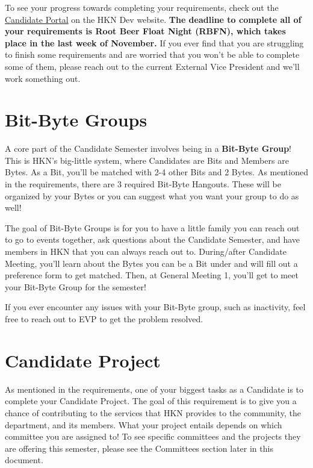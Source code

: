 \documentclass[11pt, article, oneside]{memoir}
\begin{document}
            To see your progress towards completing your requirements, check out the \href{https://hkn.mu/candportal}{Candidate Portal} on the HKN Dev website. \textbf{The deadline to complete all of your requirements is Root Beer Float Night (RBFN), which takes place in the last week of November.} If you ever find that you are struggling to finish some requirements and are worried that you won't be able to complete some of them, please reach out to the current External Vice President and we'll work something out.
    
            \bigbreak


    \section{Bit-Byte Groups}
        A core part of the Candidate Semester involves being in a \textbf{Bit-Byte Group}! This is HKN's big-little system, where Candidates are Bits and Members are Bytes. As a Bit, you'll be matched with 2-4 other Bits and 2 Bytes. As mentioned in the requirements, there are 3 required Bit-Byte Hangouts. These will be organized by your Bytes or you can suggest what you want your group to do as well!
        
        \bigbreak

        The goal of Bit-Byte Groups is for you to have a little family you can reach out to go to events together, ask questions about the Candidate Semester, and have members in HKN that you can always reach out to. During/after Candidate Meeting, you'll learn about the Bytes you can be a Bit under and will fill out a preference form to get matched. Then, at General Meeting 1, you'll get to meet your Bit-Byte Group for the semester! 
        
        \bigbreak

        If you ever encounter any issues with your Bit-Byte group, such as inactivity, feel free to reach out to EVP to get the problem resolved.

    \section{Candidate Project}
        As mentioned in the requirements, one of your biggest tasks as a Candidate is to complete your Candidate Project. The goal of this requirement is to give you a chance of contributing to the services that HKN provides to the community, the department, and its members. What your project entails depends on which committee you are assigned to! To see specific committees and the projects they are offering this semester, please see the Committees section later in this document.
        
\end{document}

